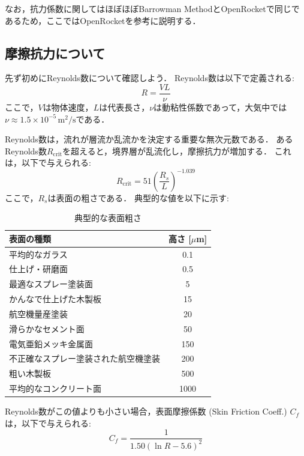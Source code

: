 \documentclass[uplatex,dvipdfmx,a4j,11pt]{jsarticle}
\begin{document}
なお，抗力係数に関してはほぼほぼBarrowman MethodとOpenRocketで同じであるため，ここではOpenRocketを参考に説明する．

\subsection{摩擦抗力について}
先ず初めにReynolds数について確認しよう．
Reynolds数は以下で定義される:
\begin{equation}
  R = \frac{V L}{\nu}
\end{equation}
ここで，$V$は物体速度，$L$は代表長さ，$\nu$は動粘性係数であって，大気中では$\nu \approx 1.5 \times 10^{-5} \,\mathrm{m^2/s}$である．

Reynolds数は，流れが層流か乱流かを決定する重要な無次元数である．
あるReynolds数$R_\mathrm{crit}$を超えると，境界層が乱流化し，摩擦抗力が増加する．
これは，以下で与えられる:
\begin{equation}
  R_\mathrm{crit} = 51 \left(\frac{R_s}{L}\right)^{-1.039}
  \tag{OR.3.79}
\end{equation}
ここで，$R_s$は表面の粗さである．
典型的な値を以下に示す:
\begin{table}[htbp]
  \centering
  \caption{典型的な表面粗さ}
  \label{tab:surface_roughness}
  \begin{tabular}{lc}
    \hline
    表面の種類 & 高さ [$\mu$m] \\
    \hline\hline
    平均的なガラス & 0.1 \\
    仕上げ・研磨面 & 0.5 \\
    最適なスプレー塗装面 & 5 \\
    かんなで仕上げた木製板 & 15 \\
    航空機量産塗装 & 20 \\
    滑らかなセメント面 & 50 \\
    電気亜鉛メッキ金属面 & 150 \\
    不正確なスプレー塗装された航空機塗装 & 200 \\
    粗い木製板 & 500 \\
    平均的なコンクリート面 & 1000 \\
    \hline
  \end{tabular}
\end{table}

\enskip

Reynolds数がこの値よりも小さい場合，表面摩擦係数 (Skin Friction Coeff.) $C_f$は，以下で与えられる:
\begin{equation}
  C_f = \frac{1}{1.50 (\ln R - 5.6)^2}
  \tag{OR.3.78}
\end{equation}
\end{document}
